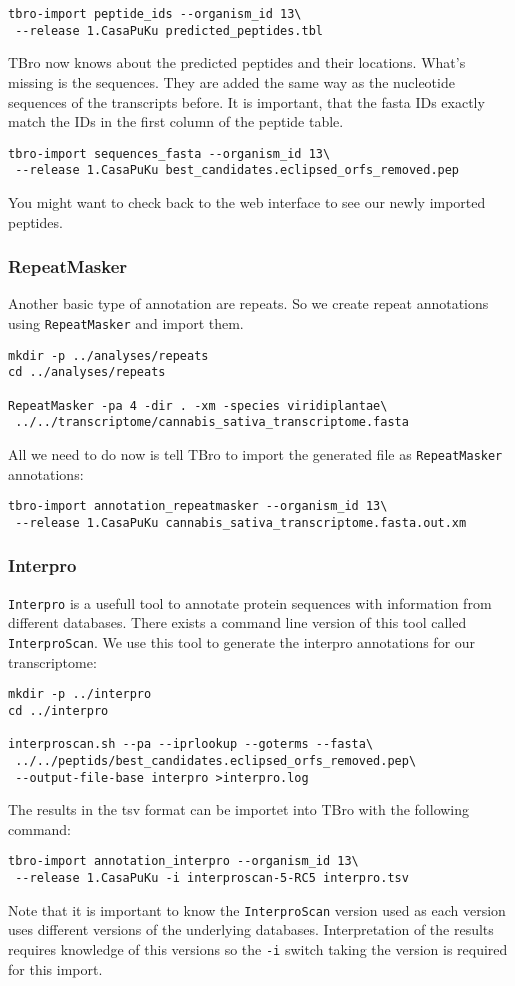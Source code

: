 \documentclass[english]{scrartcl}
\begin{document}
\begin{lstlisting}
tbro-import peptide_ids --organism_id 13\
 --release 1.CasaPuKu predicted_peptides.tbl
\end{lstlisting}
TBro now knows about the predicted peptides and their locations. What's missing
is the sequences. They are added the same way as the nucleotide sequences of the
transcripts before. It is important, that the fasta IDs exactly match the IDs in
the first column of the peptide table.
\begin{lstlisting}
tbro-import sequences_fasta --organism_id 13\
 --release 1.CasaPuKu best_candidates.eclipsed_orfs_removed.pep
\end{lstlisting}
You might want to check back to the web interface to see our newly imported
peptides.

\subsubsection{RepeatMasker}
Another basic type of annotation are repeats. So we create repeat annotations
using \texttt{RepeatMasker} and import them.  
\begin{lstlisting}
mkdir -p ../analyses/repeats
cd ../analyses/repeats

RepeatMasker -pa 4 -dir . -xm -species viridiplantae\
 ../../transcriptome/cannabis_sativa_transcriptome.fasta
\end{lstlisting}
All we need to do now is tell TBro to import the generated file as \texttt{RepeatMasker}
annotations:
\begin{lstlisting}
tbro-import annotation_repeatmasker --organism_id 13\
 --release 1.CasaPuKu cannabis_sativa_transcriptome.fasta.out.xm
\end{lstlisting}

\subsubsection{Interpro}
\texttt{Interpro} is a usefull tool to annotate protein sequences with information from
different databases. There exists a command line version of this tool called
\texttt{InterproScan}. We use this tool to generate the interpro
annotations for our transcriptome:
\begin{lstlisting}
mkdir -p ../interpro
cd ../interpro

interproscan.sh --pa --iprlookup --goterms --fasta\
 ../../peptids/best_candidates.eclipsed_orfs_removed.pep\
 --output-file-base interpro >interpro.log
\end{lstlisting}
The results in the tsv format can be importet into TBro with the following
command:
\begin{lstlisting}
tbro-import annotation_interpro --organism_id 13\
 --release 1.CasaPuKu -i interproscan-5-RC5 interpro.tsv
\end{lstlisting}
Note that it is important to know the \texttt{InterproScan} version used as each
version uses different versions of the underlying databases. Interpretation of
the results requires knowledge of this versions so the \texttt{-i} switch taking
the version is required for this import.
\end{document}
